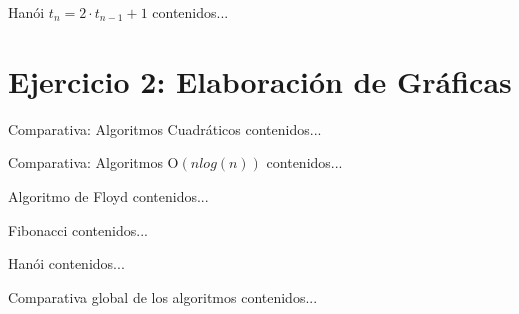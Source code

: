 \documentclass[10pt,compress,usetitleprogressbar,mathserif]{beamer}
\begin{document}
\begin{frame}{Hanói $t_n=2 \cdot t_{n-1}+1 $}
	contenidos...
\end{frame}

\section{Ejercicio 2: Elaboración de Gráficas}

\begin{frame}{\small{Comparativa: Algoritmos Cuadráticos}}
	contenidos...
\end{frame}

\begin{frame}{\small{Comparativa: Algoritmos O$(nlog(n))$}}
	contenidos...
\end{frame}

\begin{frame}{Algoritmo de Floyd}
	contenidos...
\end{frame}

\begin{frame}{Fibonacci}
	contenidos...
\end{frame}

\begin{frame}{Hanói}
	contenidos...
\end{frame}

\begin{frame}{\small{Comparativa global de los algoritmos}}
	contenidos...
\end{frame}
\end{document}
